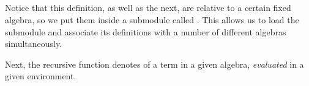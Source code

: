\begin{code}
\AgdaSymbol{)}\AgdaSpace{}%
\AgdaSpace{}%
\AgdaSpace{}%
\AgdaSpace{}%
\AgdaSpace{}%
\AgdaSpace{}%
\<%
\\
%
\>[17]\AgdaSymbol{;}\AgdaSpace{}%
\AgdaSpace{}%
\AgdaSymbol{=}\AgdaSpace{}%
%
\>[43]\AgdaSymbol{\{}\AgdaSpace{}%
%
\>[52]\AgdaSymbol{=}\AgdaSpace{}%
\AgdaSpace{}%
\AgdaBound{\AgdaUnderscore{}}%
\>[63]\AgdaSpace{}%
\<%
\\
%
\>[43]\AgdaSymbol{;}\AgdaSpace{}%
%
\>[52]\AgdaSymbol{=}\AgdaSpace{}%
\AgdaSpace{}%
\AgdaSpace{}%
%
\>[63]\AgdaSpace{}%
\AgdaSpace{}%
\AgdaSymbol{(}\AgdaSpace{}%
\AgdaSymbol{)}\<%
\\
%
\>[43]\AgdaSymbol{;}\AgdaSpace{}%
%
\>[52]\AgdaSymbol{=}\AgdaSpace{}%
\AgdaSpace{}%
\AgdaSpace{}%
\AgdaSpace{}%
%
\>[63]\AgdaSpace{}%
\AgdaSpace{}%
\AgdaSymbol{(}\AgdaSpace{}%
\AgdaSymbol{)(}\AgdaSpace{}%
\AgdaSymbol{)}\AgdaSpace{}%
\AgdaSymbol{\}\}}\<%
\\
\>[0]\<%
\end{code}
\ifshort\else
Notice that this definition, as well as the next, are relative to a certain fixed algebra,
so we put them inside a submodule called . This allows us to load the
submodule and associate its definitions with a number of different algebras simultaneously.
\fi

Next, the recursive function  denotes  of
a term in a given algebra, \emph{evaluated} in a given environment.

